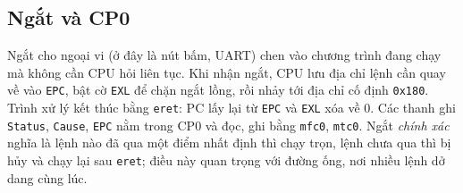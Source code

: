 \subsection{Ngắt và CP0}\label{sec:ngat-lt}
Ngắt cho ngoại vi (ở đây là nút bấm, UART) chen vào chương trình đang chạy mà không cần CPU hỏi liên tục. Khi nhận ngắt, CPU lưu địa chỉ lệnh cần quay về vào \texttt{EPC}, bật cờ \texttt{EXL} để chặn ngắt lồng, rồi nhảy tới địa chỉ cố định \texttt{0x180}. Trình xử lý kết thúc bằng \texttt{eret}: PC lấy lại từ \texttt{EPC} và \texttt{EXL} xóa về 0. Các thanh ghi \texttt{Status}, \texttt{Cause}, \texttt{EPC} nằm trong CP0 và đọc, ghi bằng \texttt{mfc0}, \texttt{mtc0}. Ngắt \emph{chính xác} nghĩa là lệnh nào đã qua một điểm nhất định thì chạy trọn, lệnh chưa qua thì bị hủy và chạy lại sau \texttt{eret}; điều này quan trọng với đường ống, nơi nhiều lệnh dở dang cùng lúc.

